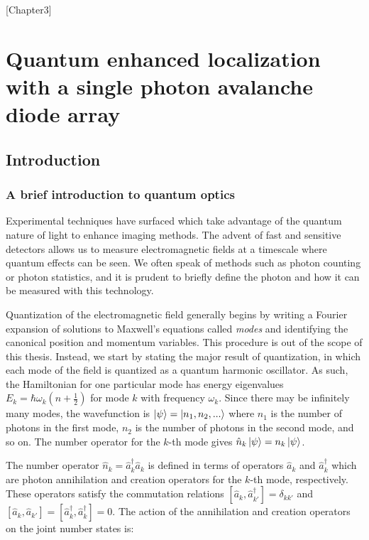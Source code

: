 [Chapter3]
\chapter{Quantum enhanced localization with a single photon avalanche diode array}

\section{Introduction}

\subsection{A brief introduction to quantum optics}

Experimental techniques have surfaced which take advantage of the quantum nature of light to enhance imaging methods. The advent of fast and sensitive detectors allows us to measure electromagnetic fields at a timescale where quantum effects can be seen. We often speak of methods such as photon counting or photon statistics, and it is prudent to briefly define the photon and how it can be measured with this technology.

Quantization of the electromagnetic field generally begins by writing a Fourier expansion of solutions to Maxwell's equations called \emph{modes} and identifying the canonical position and momentum variables. This procedure is out of the scope of this thesis. Instead, we start by stating the major result of quantization, in which each mode of the field is quantized as a quantum harmonic oscillator. As such, the Hamiltonian for one particular mode has energy eigenvalues $E_{k} = \hbar\omega_{k}(n + \frac{1}{2})$ for mode $k$ with frequency $\omega_{k}$. Since there may be infinitely many modes, the wavefunction is $\ket{\psi} = \ket{n_{1},n_{2},...}$ where $n_1$ is the number of photons in the first mode, $n_2$ is the number of photons in the second mode, and so on. The number operator for the $k$-th mode gives $\hat{n}_k\ket{\psi} = n_{k}\ket{\psi}$.

The number operator $\hat{n}_k = \hat{a}_k^\dagger\hat{a}_k$ is defined in terms of operators $\hat{a}_k$ and $\hat{a}_k^\dagger$ which are photon annihilation and creation operators for the $k$-th mode, respectively. These operators satisfy the commutation relations $[\hat{a}_k, \hat{a}_{k'}^\dagger] = \delta_{kk'}$ and $[\hat{a}_k, \hat{a}_{k'}] = [\hat{a}_k^\dagger, \hat{a}_k^\dagger] = 0$. The action of the annihilation and creation operators on the joint number states is:

